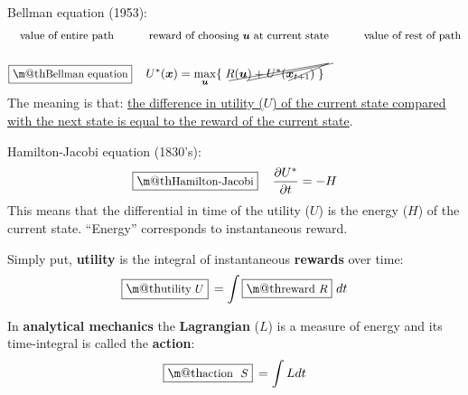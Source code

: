 \documentclass[orivec]{llncs}
\makeatletter
\newcommand{\emp}[1]{\textbf{#1}}
\newcommand{\tikzmark}[1]{\tikz[overlay,remember picture] \node (#1) {};}
\newcommand{\vect}[1]{\boldsymbol{#1}}
\renewcommand{\boxed}[1]{\fbox{\m@th$\displaystyle\scalebox{0.9}{#1}$} \,}
\makeatother
\begin{document}
Bellman equation (1953):
\begin{eqnarray}
& \mbox{\footnotesize value of entire path} \tikzmark{uEntire} \quad \quad \mbox{\footnotesize reward of choosing $\vect{u}$ at current state} \tikzmark{rCurrent} \quad \quad \mbox{\footnotesize value of rest of path} \tikzmark{uRest} \nonumber \\
\nonumber \\
& \boxed{\mbox{Bellman equation}} \quad \tikzmark{UEntire} U^*(\vect{x}) = \max\limits_{\vect{u}} \{ \; \tikzmark{RCurrent} R(\vect{u}) + \tikzmark{URest} U^*(\vect{x}_{t+1}) \; \}
\begin{tikzpicture}[overlay,remember picture]
  \draw (uEntire.center) +(-30pt,-3pt) -- ([shift={(4pt,12pt)}]UEntire.center);
  \draw (rCurrent.center) +(-80pt,-3pt) -- ([shift={(4pt,12pt)}]RCurrent.center);
  \draw (uRest.center) +(-65pt,-3pt) -- ([shift={(8pt,12pt)}]URest.center);
\end{tikzpicture}
\label{Bellman-eqn}
\end{eqnarray}
The meaning is that:  \uline{the difference in utility ($U$) of the current state compared with the next state is equal to the reward of the current state}.

Hamilton-Jacobi equation (1830's):
\begin{equation}
\boxed{\mbox{Hamilton-Jacobi}} \quad
\frac{\partial U^*}{\partial t} = - H
\label{Hamilton-Jacobi-eqn}
\end{equation}
This means that the differential in time of the utility ($U$) is the energy ($H$) of the current state.  ``Energy'' corresponds to instantaneous reward.

Simply put, \textbf{utility} is the integral of instantaneous \textbf{rewards} over time:
\begin{equation}
\boxed{\mbox{utility} $U$} = \int \boxed{\mbox{reward} $R$} \,dt
\end{equation}


In \emp{analytical mechanics} the \textbf{Lagrangian} ($L$) is a measure of energy and its time-integral is called the \textbf{action}:
\begin{equation}
\boxed{\mbox{action } $S$} = \int L dt
\end{equation}
\end{document}

